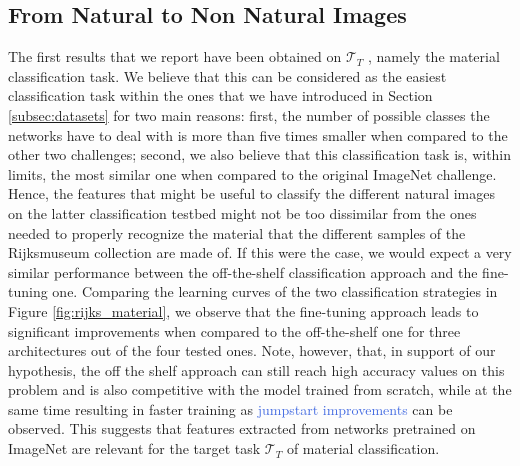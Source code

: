 \subsection{From Natural to Non Natural Images}
\label{subsec: natural_to_art}

The first results that we report have been obtained on $\mathcal{T}_T$ , namely the material classification task. We believe that this can be considered as the easiest classification task within the ones that we have introduced in Section \ref{subsec:datasets} for two main reasons: first, the number of possible classes the networks have to deal with is more than five times smaller when compared to the other two challenges; second, we also believe that this classification task is, within limits, the most similar one when compared to the original ImageNet challenge. Hence, the features that might be useful to classify the different natural images on the latter classification testbed might not be too dissimilar from the ones needed to properly recognize the material that the different samples of the Rijksmuseum collection are made of. If this were the case, we would expect a very similar performance between the off-the-shelf classification approach and the fine-tuning one. Comparing the learning curves of the two classification strategies in Figure \ref{fig:rijks_material}, we observe that the fine-tuning approach leads to significant improvements when compared to the off-the-shelf one for three architectures out of the four tested ones. Note, however, that, in support of our hypothesis, the off the shelf approach can still reach high accuracy values on this problem and is also competitive with the model trained from scratch, while at the same time resulting in faster training as \textcolor{RoyalBlue}{jumpstart improvements} can be observed. This suggests that features extracted from networks pretrained on ImageNet are relevant for the target task $\mathcal{T}_T$ of material classification.



